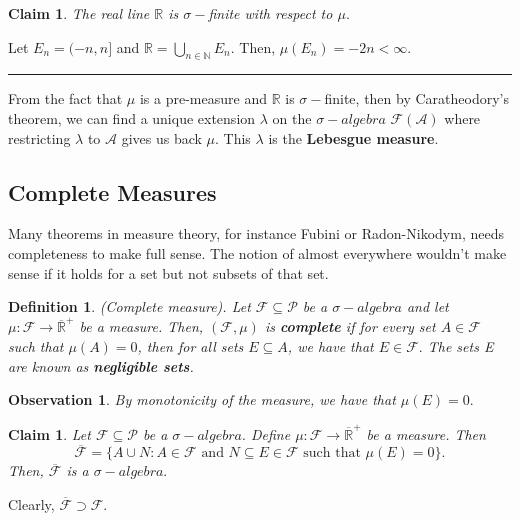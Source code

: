 \documentclass[twoside]{article}
\newtheorem{claim}[theorem]{Claim}
\newtheorem{definition}[theorem]{Definition}
\newtheorem{observation}[theorem]{Observation}
\newenvironment{proof}{{\bf Proof:}}{\hfill\rule{2mm}{2mm}}
\newcommand{\algebra}{\mathcal{A}}
\newcommand{\sigmalgebra}{\mathcal{F}}
\newcommand{\sa}{\sigma-algebra}
\newcommand{\powerset}{\mathcal{P}}
\newcommand{\positiveextendedreal}{\overline{\mathbb{R}}^+}
\begin{document}
\begin{claim}The real line $\mathbb{R}$ is $\sigma-$finite with respect to $\mu.$
\end{claim}

\begin{proof}Let $E_n = (-n,n]$ and $\mathbb{R} = \bigcup_{n \in \mathbb{N}}E_n$. Then, $\mu(E_n) = -2n < \infty.$
\end{proof}

From the fact that $\mu$ is a pre-measure and $\mathbb{R}$ is $\sigma-$finite, then by Caratheodory's theorem, we can find a unique extension $\lambda$ on the $\sa$ $\sigmalgebra(\algebra)$ where restricting $\lambda$ to $\algebra$ gives us back $\mu$. This $\lambda$ is the \textbf{Lebesgue measure}.
 
\subsection{Complete Measures}
Many theorems in measure theory, for instance Fubini or Radon-Nikodym, needs completeness to make full sense. The notion of almost everywhere wouldn't make sense if it holds for a set but not subsets of that set.

\begin{definition}(Complete measure). Let $\sigmalgebra \subseteq \powerset$ be a $\sa$ and let $\mu: \sigmalgebra \rightarrow \positiveextendedreal$ be a measure. Then, $(\sigmalgebra, \mu)$ is \textbf{complete} if for every set $A \in \sigmalgebra$ such that $\mu(A) = 0$, then for all sets $E \subseteq A$, we have that $E \in \sigmalgebra.$ The sets E are known as \textbf{negligible sets}.
\end{definition}

\begin{observation}By monotonicity of the measure, we have that $\mu(E) = 0.$
\end{observation}



\begin{claim}Let $\sigmalgebra \subseteq \powerset$ be a $\sa.$ Define $\mu: \sigmalgebra \rightarrow \positiveextendedreal$ be a measure. Then 
$$
\overline{\sigmalgebra} = \{A \cup N: A \in \sigmalgebra \text{ and } N \subseteq E \in \sigmalgebra \text{ such that } \mu(E) = 0\}.
$$
Then, $\overline{\sigmalgebra}$ is a $\sa.$
\end{claim}

Clearly, $\overline{\sigmalgebra} \supset \sigmalgebra.$ 
\end{document}
